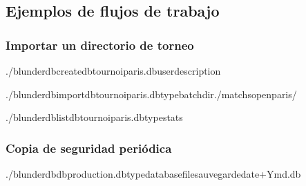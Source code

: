 \documentclass[letterpaper,10pt,spanish]{sphinxmanual}
\begin{document}
\subsection{Ejemplos de flujos de trabajo}
\label{\detokenize{cli:exemples-de-flux-de-travail}}

\subsubsection{Importar un directorio de torneo}
\label{\detokenize{cli:import-d-un-repertoire-de-tournoi}}
\begin{sphinxVerbatim}[commandchars=\\\{\}]
./blunderdbcreate\PYGZhy{}\PYGZhy{}dbtournoi\PYGZus{}paris.db\PYGZhy{}\PYGZhy{}user\PYGZhy{}\PYGZhy{}description

./blunderdbimport\PYGZhy{}\PYGZhy{}dbtournoi\PYGZus{}paris.db\PYGZhy{}\PYGZhy{}typebatch\PYGZhy{}\PYGZhy{}dir./matchs\PYGZus{}open\PYGZus{}paris/

./blunderdblist\PYGZhy{}\PYGZhy{}dbtournoi\PYGZus{}paris.db\PYGZhy{}\PYGZhy{}typestats
\end{sphinxVerbatim}


\subsubsection{Copia de seguridad periódica}
\label{\detokenize{cli:sauvegarde-reguliere}}
\begin{sphinxVerbatim}[commandchars=\\\{\}]
./blunderdb\PYGZhy{}\PYGZhy{}dbproduction.db\PYGZhy{}\PYGZhy{}typedatabase\PYGZhy{}\PYGZhy{}filesauvegarde\PYGZhy{}date+\PYGZpc{}Y\PYGZpc{}m\PYGZpc{}d.db
\end{sphinxVerbatim}
\end{document}
